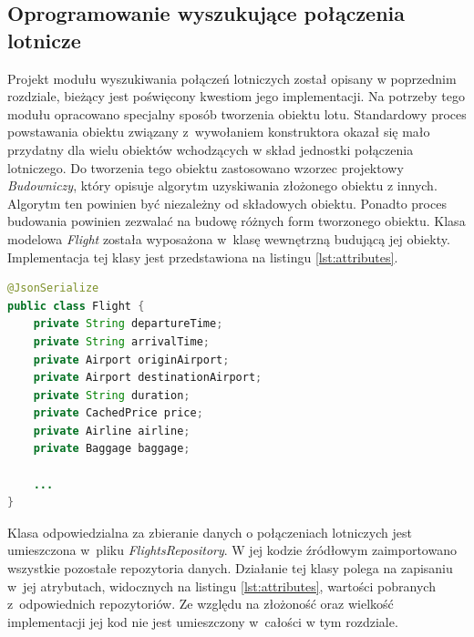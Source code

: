 \documentclass[12pt, twoside]{report}
\begin{document}
\subsection{Oprogramowanie wyszukujące połączenia lotnicze}
Projekt modułu wyszukiwania połączeń lotniczych został opisany w poprzednim rozdziale, bieżący jest poświęcony kwestiom jego implementacji. Na potrzeby tego modułu opracowano specjalny sposób tworzenia obiektu lotu. Standardowy proces powstawania obiektu związany z~wywołaniem konstruktora okazał się mało przydatny dla wielu obiektów wchodzących w skład jednostki połączenia lotniczego. Do tworzenia tego obiektu zastosowano wzorzec projektowy \textit{Budowniczy}, który opisuje algorytm uzyskiwania złożonego obiektu z innych. Algorytm ten powinien być niezależny od składowych obiektu. Ponadto proces budowania powinien zezwalać na budowę różnych form tworzonego obiektu.\cite{builder}
Klasa modelowa \textit{Flight} została wyposażona w~klasę wewnętrzną budującą jej obiekty. Implementacja tej klasy jest przedstawiona na listingu \ref{lst:attributes}.
\begin{lstlisting}[language=java, caption=Fragment klasy Flight, label=lst:attributes]
@JsonSerialize
public class Flight {
    private String departureTime;
    private String arrivalTime;
    private Airport originAirport;
    private Airport destinationAirport;
    private String duration;
    private CachedPrice price;
    private Airline airline;
    private Baggage baggage;
    
    ...
}
\end{lstlisting}
Klasa odpowiedzialna za zbieranie danych o połączeniach lotniczych jest umieszczona w~pliku \textit{FlightsRepository}. W jej kodzie źródłowym zaimportowano wszystkie pozostałe repozytoria danych. 
Działanie tej klasy polega na zapisaniu w~jej atrybutach, widocznych na listingu \ref{lst:attributes}, wartości pobranych z~odpowiednich repozytoriów. Ze względu na złożoność oraz wielkość implementacji jej kod nie jest umieszczony w~całości w tym rozdziale.
\end{document}
